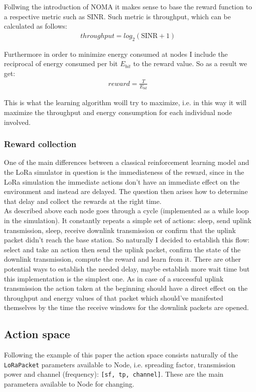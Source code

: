 Follwing the introduction of NOMA it makes sense to base
the reward function to a respective metric such as SINR.
Such metric is throughput, which can be calculated as follows: 
\begin{align}
throughput = log_2(\text{SINR}+ 1)
\end{align}

Furthermore in order to minimize energy consumed at nodes I 
include the reciprocal of energy consumed per bit $E_{bit}$ to the reward
value. So as a result we get:
\begin{align}
    reward = \frac{T}{E_{bit}}
\end{align}

This is what the learning algorithm woill try to maximize, i.e. in this way it will maximize the 
throughput and energy consumption for each individual
node involved. 

\subsubsection{Reward collection}

One of the main differences between a classical reinforcement
learning model and the LoRa simulator in question is the immediateness of the reward, since in the LoRa simulation the immediate actions don't have an immediate effect on the environment and instead are delayed. The question then arises how to determine that delay and collect the rewards at the right time. \\

As described above each node goes through a cycle (implemented 
as a while loop in the simulation). It constantly repeats
a simple set of actions: sleep, send uplink transmission, sleep,
receive downlink transmission or confirm that the uplink 
packet didn't reach the base station. So naturally I decided to establish this flow:
select and take an action then send the uplink packet,
confirm the state of the downlink transmission, compute
the reward and learn from it. There are other potential 
ways to establish the needed delay, maybe 
establish more wait time but this implementation is the 
simplest one. As in case of a successful uplink transmission
the action taken at the beginning should have a direct effect on the throughput and energy values of that packet 
which should've manifested themselves by the time the receive
windows for the downlink packets are opened. 

\subsection{Action space}
Following the example of this paper \cite{rl_lora_original} the action space consists naturally of the \texttt{LoRaPacket} 
parameters available to Node, i.e. spreading factor,
transmission power and channel (frequency): 
\texttt{[sf, tp, channel]}. These are the main
parametera available to Node for changing. \\

